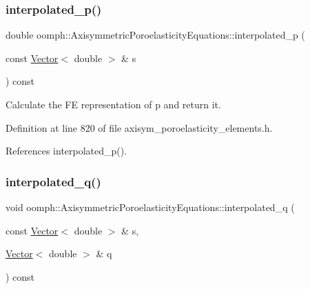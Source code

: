 \subsubsection{\texorpdfstring{interpolated\+\_\+p()}{interpolated\_p()}\hspace{0.1cm}{\footnotesize\ttfamily [2/2]}}
{\footnotesize\ttfamily double oomph\+::\+Axisymmetric\+Poroelasticity\+Equations\+::interpolated\+\_\+p (\begin{DoxyParamCaption}\item[{const \hyperlink{classoomph_1_1Vector}{Vector}$<$ double $>$ \&}]{s }\end{DoxyParamCaption}) const\hspace{0.3cm}{\ttfamily [inline]}}



Calculate the FE representation of p and return it. 



Definition at line 820 of file axisym\+\_\+poroelasticity\+\_\+elements.\+h.



References interpolated\+\_\+p().

\mbox{\label{classoomph_1_1AxisymmetricPoroelasticityEquations_a412b654ecb7e8ba819877db02a382dfd}} 
\subsubsection{\texorpdfstring{interpolated\+\_\+q()}{interpolated\_q()}\hspace{0.1cm}{\footnotesize\ttfamily [1/4]}}
{\footnotesize\ttfamily void oomph\+::\+Axisymmetric\+Poroelasticity\+Equations\+::interpolated\+\_\+q (\begin{DoxyParamCaption}\item[{const \hyperlink{classoomph_1_1Vector}{Vector}$<$ double $>$ \&}]{s,  }\item[{\hyperlink{classoomph_1_1Vector}{Vector}$<$ double $>$ \&}]{q }\end{DoxyParamCaption}) const\hspace{0.3cm}{\ttfamily [inline]}}



